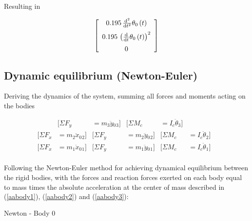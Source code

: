 Resulting in 

\begin{equation}\label{newaabodyAA3}
 \left[ \begin {array}{c}  0.195\,{\frac {{\rm d}^{2}}{{\rm d}{t}^{2}}
}\theta_{{0}} \left( t \right) \\ \noalign{\medskip} 0.195\, \left( {
\frac {\rm d}{{\rm d}t}}\theta_{{0}} \left( t \right)  \right) ^{2}
\\ \noalign{\medskip}0\end {array} \right] 
\end{equation}


\subsection{Dynamic equilibrium (Newton-Euler)}

Deriving the dynamics of the system, summing all forces and moments acting on the bodies

\begin{align*}
[\Sigma{F}_{x}&={m_3}\ddot{x}{_0}{_3}] & [\Sigma{F}_{y}&={m_3}\ddot{y}{_0}{_3}] & [\Sigma{M}_{c}&={I_c}\ddot{\theta}{_3}]& \\
[\Sigma{F}_{x}&={m_2}\ddot{x}{_0}{_2}] & [\Sigma{F}_{y}&={m_2}\ddot{y}{_0}{_2}]& [\Sigma{M}_{c}&={I_c}\ddot{\theta}{_2}]&\\
[\Sigma{F}_{x}&={m_1}\ddot{x}{_0}{_1}] & [\Sigma{F}_{y}&={m_1}\ddot{y}{_0}{_1}]& [\Sigma{M}_{c}&={I_c}\ddot{\theta}{_1}]&\\
\end{align*}

Following the Newton-Euler method for achieving dynamical equilibrium between the rigid bodies, with the forces and reaction forces exerted on each body equal to mass times the absolute acceleration at the center of mass described in (\ref{aabody1}), (\ref{aabody2}) and (\ref{aabody3}):   

Newton - Body 0

